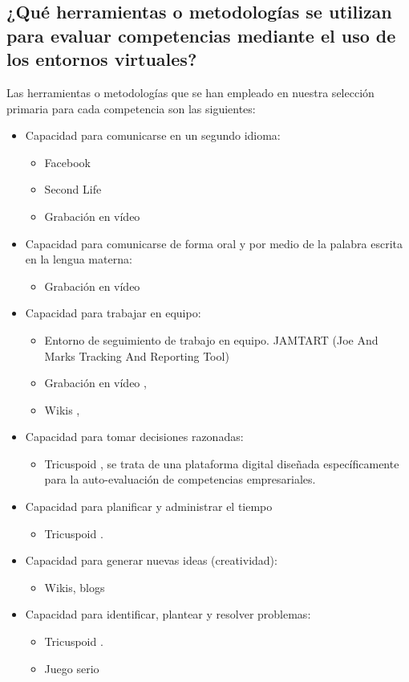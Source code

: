 \subsection{¿Qué herramientas o metodologías se utilizan para evaluar competencias mediante el uso de los entornos virtuales?}
Las herramientas o metodologías que se han empleado en nuestra selección primaria para cada competencia son las siguientes:
\begin{itemize}
\item Capacidad para comunicarse en un segundo idioma:
	\begin{itemize} 
	\item Facebook \cite{Shih:2011}
	\item Second Life \cite{MercedesRico:2013}
	\item Grabación en vídeo \cite{Masip-Alvarez:2013}
	\end{itemize}
\item Capacidad para comunicarse de forma oral y por medio de la palabra escrita en la lengua materna:
	\begin{itemize} 
	\item Grabación en vídeo \cite{Masip-Alvarez:2013}
	\end{itemize}
\item Capacidad para trabajar en equipo:
	\begin{itemize} 
	\item Entorno de seguimiento de trabajo en equipo. JAMTART (Joe And Marks Tracking And Reporting Tool) \cite{McMahon:2007}
	\item Grabación en vídeo \cite{Masip-Alvarez:2013}, \cite{Martin-Cuadrado:2013}
	\item Wikis \cite{Piedra:2010}, \cite{Lim:2011}
	\end{itemize}
\item Capacidad para tomar decisiones razonadas:
	\begin{itemize} 
	\item Tricuspoid \cite{Achcaoucaou:2012}, se trata de una plataforma digital diseñada específicamente para la auto-evaluación de competencias empresariales.
	\end{itemize}
\item Capacidad para planificar y administrar el tiempo
	\begin{itemize} 
	\item Tricuspoid \cite{Achcaoucaou:2012}.
	\end{itemize}
\item Capacidad para generar nuevas ideas (creatividad):
	\begin{itemize} 
	\item Wikis, blogs \cite{Piedra:2010}
	\end{itemize}
\item Capacidad para identificar, plantear y resolver problemas:
	\begin{itemize} 
	\item Tricuspoid \cite{Achcaoucaou:2012}.
	\item Juego serio \cite{Guenaga:2013}
	\end{itemize}
\end{itemize}

